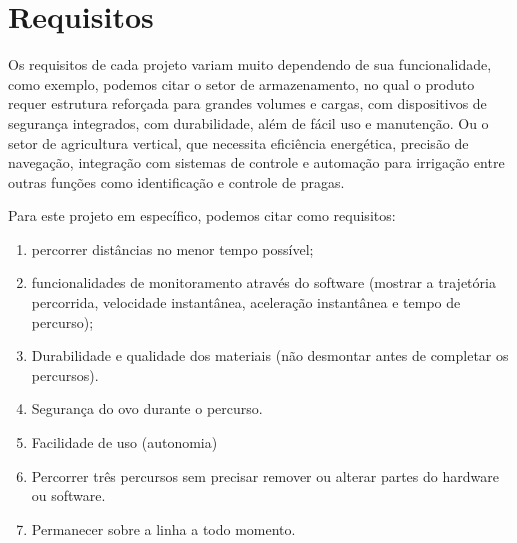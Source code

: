 \section{Requisitos}

Os requisitos de cada projeto variam muito dependendo de sua funcionalidade,
como exemplo, podemos citar o setor de armazenamento, no qual o produto requer
estrutura reforçada para grandes volumes e cargas, com dispositivos de segurança
integrados, com durabilidade, além de fácil uso e manutenção. Ou o setor de
agricultura vertical, que necessita eficiência energética, precisão de
navegação, integração com sistemas de controle e automação para irrigação entre
outras funções como identificação e controle de pragas.

Para este projeto em específico, podemos citar como requisitos:

%
%
\begin{enumerate}
  \item percorrer distâncias no menor tempo possível;
  \item
    funcionalidades de monitoramento através do software (mostrar a trajetória
    percorrida, velocidade instantânea, aceleração instantânea e tempo de
    percurso);
  \item
    Durabilidade e qualidade dos materiais (não desmontar antes de completar os
    percursos).
  \item Segurança do ovo durante o percurso.
  \item Facilidade de uso (autonomia)
  \item
    Percorrer três percursos sem precisar remover ou alterar partes do hardware
    ou software.
  \item Permanecer sobre a linha a todo momento.
\end{enumerate}
